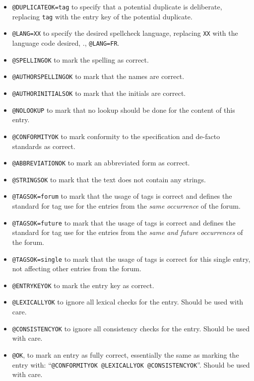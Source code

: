 \begin{itemize}
\item \texttt{@DUPLICATEOK=tag} to specify that a potential duplicate
  is deliberate, replacing \texttt{tag} with the entry key of the
  potential duplicate.
\item \texttt{@LANG=XX} to specify the desired spellcheck language,
  replacing \texttt{XX} with the language code desired, \eg.,
  \texttt{@LANG=FR}.
\item \texttt{@SPELLINGOK} to mark the spelling as correct.
\item \texttt{@AUTHORSPELLINGOK} to mark that the names are correct.
\item \texttt{@AUTHORINITIALSOK} to mark that the initials are correct.
\item \texttt{@NOLOOKUP} to mark that no lookup should be done for
  the content of this entry.
\item \texttt{@CONFORMITYOK} to mark conformity to the specification
  and de-facto standards as correct.
\item \texttt{@ABBREVIATIONOK} to mark an abbreviated form as correct.
\item \texttt{@STRINGSOK} to mark that the text does not contain any
  strings.
\item \texttt{@TAGSOK=forum} to mark that the usage of tags is correct and
  defines the standard for tag use for the entries from the \emph{same
  occurrence} of the forum.
\item \texttt{@TAGSOK=future} to mark that the usage of tags is
  correct and defines the standard for tag use for the entries from
  the \emph{same and future occurrences} of the forum.
\item \texttt{@TAGSOK=single} to mark that the usage of tags is
  correct for this single entry, not affecting other entries from the
  forum.
\item \texttt{@ENTRYKEYOK} to mark the entry key as correct.
\item \texttt{@LEXICALLYOK} to ignore all lexical checks for the
  entry.  Should be used with care.
\item \texttt{@CONSISTENCYOK} to ignore all consistency checks for the
  entry.  Should be used with care.
\item \texttt{@OK}, to mark an entry as fully correct, essentially the
  same as marking the entry with: ``\texttt{@CONFORMITYOK @LEXICALLYOK
    @CONSISTENCYOK}''.  Should be used with care.
\end{itemize}

